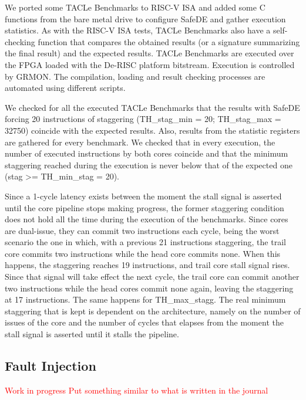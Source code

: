 We ported some TACLe Benchmarks to RISC-V ISA and added some C functions from the bare metal drive to configure SafeDE and gather execution statistics. As with the RISC-V ISA tests, TACLe Benchmarks also have a self-checking function that compares the obtained results (or a signature summarizing the final result) and the expected results. TACLe Benchmarks are executed over the FPGA loaded with the De-RISC platform bitstream. Execution is controlled by GRMON. The compilation, loading and result checking processes are automated using different scripts. 

We checked for all the executed TACLe Benchmarks that the results with SafeDE forcing 20 instructions of staggering (TH\_stag\_min = 20; TH\_stag\_max = 32750) coincide with the expected results. Also, results from the statistic registers are gathered for every benchmark. We checked that in every execution, the number of executed instructions by both cores coincide and that the minimum staggering reached during the execution is never below that of the expected one (stag >= TH\_min\_stag = 20). 

Since a 1-cycle latency exists between the moment the stall signal is asserted until the core pipeline stops making progress, the former staggering condition does not hold all the time during the execution of the benchmarks. Since cores are dual-issue, they can commit two instructions each cycle, being the worst scenario the one in which, with a previous 21 instructions staggering, the trail core commits two instructions while the head core commits none. When this happens, the staggering reaches 19 instructions, and trail core stall signal rises. Since that signal will take effect the next cycle, the trail core can commit another two instructions while the head cores commit none again, leaving the staggering at 17 instructions. The same happens for TH\_max\_stagg. The real minimum staggering that is kept is dependent on the architecture, namely on the number of issues of the core and the number of cycles that elapses from the moment the stall signal is asserted until it stalls the pipeline. 

\bigskip



\subsection{Fault Injection}
\textcolor{red}{Work in progress}
\textcolor{red}{Put something similar to what is written in the journal}

